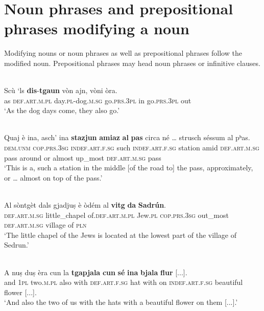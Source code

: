 \section{Noun phrases and prepositional phrases modifying a noun}
Modifying nouns or noun phrases as well as prepositional phrases follow the modified noun. Prepositional phrases may head noun phrases or infinitive clauses.

\ea
\label{ex:npnoun1}
\\
\gll  Scù `ls \textbf{dis}-\textbf{tgaun} vòn ajn, vòni òra.  \\
     as \textsc{def.art.m.pl} day.\textsc{pl}-dog.\textsc{m.sg} go.\textsc{prs.3pl} in go.\textsc{prs.3pl} out\\
\glt `As the dog days come, they also go.'
\z

\ea\label{}
\\
\gll Quaj è ina, asch’ ina \textbf{stazjun} \textbf{amiaz} \textbf{al} \textbf{pas} circa né … strusch séssum al pʰas.\\
\textsc{dem.unm} \textsc{cop.prs.3sg} \textsc{indef.art.f.sg} such \textsc{indef.art.f.sg} station amid \textsc{def.art.m.sg} pass around or {} almost up\_most \textsc{def.art.m.sg} pass\\
\glt `This is a, such a station in the middle [of the road to] the pass, approximately, or … almost on top of the pass.'
\z

\ea\label{}
\\
\gll Al sòntgèt dals gjadjuṣ è òdém al \textbf{vitg} \textbf{da} \textbf{Sadrún}.\\
\textsc{def.art.m.sg} little\_chapel of.\textsc{def.art.m.pl} Jew.\textsc{pl} \textsc{cop.prs.3sg}  out\_most \textsc{def.art.m.sg} village of \textsc{pln} \\
\glt `The little chapel of the Jews is located at the lowest part of the village of Sedrun.'
\z


\ea\label{}
\\
	\gll    A nuṣ duṣ èra cun la \textbf{tgapjala} \textbf{cun} \textbf{sé} \textbf{ina} \textbf{bjala} \textbf{flur} [...].\\
and \textsc{1pl} two.\textsc{m.pl} also with \textsc{def.art.f.sg} hat with on \textsc{indef.art.f.sg} beautiful flower [...].\\
\glt `And also the two of us with the hats with a beautiful flower on them [...].'
\z

